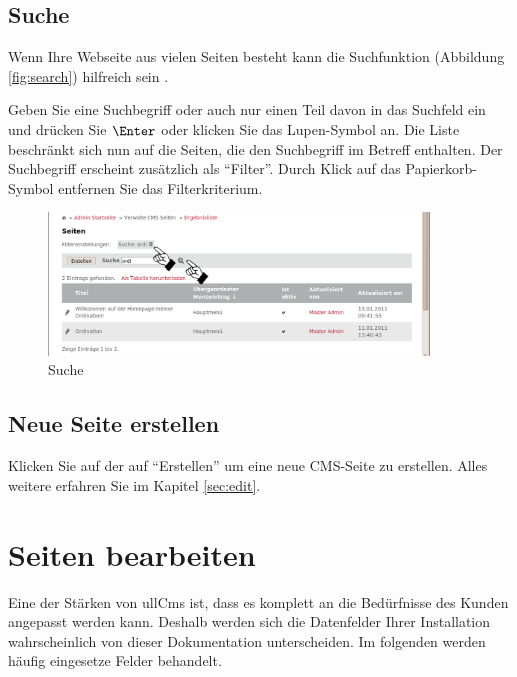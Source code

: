 \documentclass[article, a4paper, oneside, 11pt]{memoir}
\begin{document}
\subsection{Suche}

Wenn Ihre Webseite aus vielen Seiten besteht kann die Suchfunktion (Abbildung \vref{fig:search}) hilfreich sein .

Geben Sie eine Suchbegriff oder auch nur einen Teil davon in das Suchfeld ein und drücken Sie $\Enter$ oder klicken Sie das Lupen-Symbol an.
Die Liste beschränkt sich nun auf die Seiten, die den Suchbegriff im Betreff enthalten. Der Suchbegriff erscheint zusätzlich als "`Filter"'. Durch Klick auf das Papierkorb-Symbol entfernen Sie das Filterkriterium.

\begin{figure}[htp]
\centering
\includegraphics[width=0.9\textwidth]{search}
\caption{Suche}
\label{fig:search}
\end{figure}



\subsection{Neue Seite erstellen}

Klicken Sie auf der auf "`Erstellen"' um eine neue CMS-Seite zu erstellen. Alles weitere erfahren Sie im Kapitel \vref{sec:edit}.


\section{Seiten bearbeiten}
\label{sec:edit}

Eine der Stärken von ullCms ist, dass es komplett an die Bedürfnisse des Kunden angepasst werden kann.
Deshalb werden sich die Datenfelder Ihrer Installation wahrscheinlich von dieser Dokumentation unterscheiden. Im folgenden werden häufig eingesetze Felder behandelt.
\end{document}
